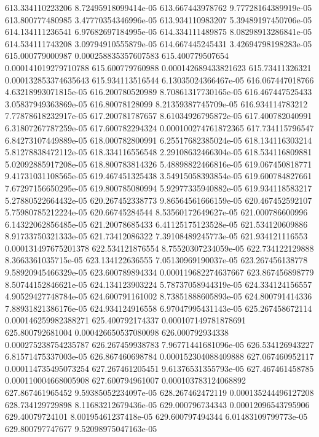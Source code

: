 {613.334110223206 8.72495918099414e-05
613.667443978762 9.77728164389919e-05
613.800777480985 3.47770354346996e-05
613.934110983207 5.39489197450706e-05
614.134111236541 6.97682697184995e-05
614.334111489875 8.08298913286841e-05
614.534111743208 3.09794910555879e-05
614.667445245431 3.42694798198283e-05
615.000779000987 0.000258835357607583
615.400779507654 0.000141019279710788
615.600779760988 0.000142689433821623
615.73411326321 0.000132853374635643
615.934113516544 6.13035024366467e-05
616.067447018766 4.63218993071815e-05
616.200780520989 8.70861317730165e-05
616.467447525433 3.05837949363869e-05
616.80078128099 8.21359387745709e-05
616.934114783212 7.77878618232917e-05
617.200781787657 8.61034926795872e-05
617.400782040991 6.31807267787259e-05
617.600782294324 0.000100274761872365
617.734115796547 6.84273107449889e-05
618.000782800991 6.25517682385024e-05
618.134116303214 5.81278838472112e-05
618.334116556548 2.29108632466304e-05
618.534116809881 5.02092885917208e-05
618.800783814326 5.48898822466816e-05
619.067450818771 9.41731031108565e-05
619.467451325438 3.54915058393854e-05
619.600784827661 7.67297156650295e-05
619.800785080994 5.92977335940882e-05
619.934118583217 5.27880522664432e-05
620.267452338773 9.86564561666159e-05
620.467452592107 5.75980785212224e-05
620.66745284544 8.53560172649627e-05
621.000786600996 6.14322062856485e-05
621.20078685433 6.41125175123528e-05
621.534120609886 8.91733750321333e-05
621.73412086322 7.39108489245773e-05
621.934121116553 0.000131497675201378
622.534121876554 8.75520307234059e-05
622.734122129888 8.3663361035715e-05
623.134122636555 7.05130969190037e-05
623.267456138778 9.58920945466329e-05
623.600789894334 0.000119682274637667
623.867456898779 8.50744152846621e-05
624.134123903224 5.78737058944319e-05
624.334124156557 4.90529427748784e-05
624.600791161002 8.73851888605893e-05
624.800791414336 7.88931821386176e-05
624.934124916558 6.97047995431143e-05
625.267458672114 0.000146259982388271
625.400792174337 0.000107149781878691
625.800792681004 0.000426650537080098
626.000792934338 0.000275238754235787
626.267459938783 7.96771441681096e-05
626.534126943227 6.81571475337003e-05
626.867460698784 0.000152304088409888
627.067460952117 0.000114735495073254
627.267461205451 9.61376531355793e-05
627.467461458785 0.000110004668005908
627.600794961007 0.000103783124068892
627.867461965452 9.59385052234097e-05
628.267462472119 0.000135244496127208
628.734129729898 8.11683212679436e-05
629.000796734343 0.00012096543795906
629.40079724101 8.00195461237418e-05
629.600797494344 6.01483109799773e-05
629.800797747677 9.52098975047163e-05
}
